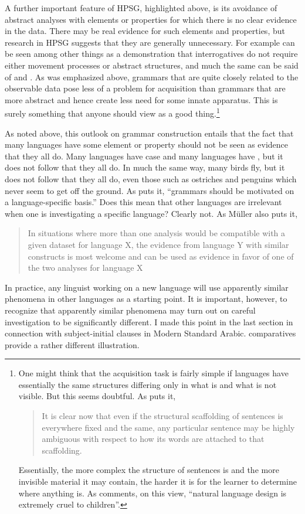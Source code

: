 \documentclass[output=paper]{langsci/langscibook}
\begin{document}
A further important feature of \gls{HPSG}, highlighted above, is its avoidance
of abstract analyses with elements or properties for which there is no clear
evidence in the data. There may be real evidence for such elements and
properties, but research in \gls{HPSG} suggests that they are generally
unnecessary.  For example \citet{GinSag2000} can be seen among other things as
a demonstration that  interrogatives do not require either
movement processes or abstract structures, and much the same can be said of
\citet{Sag1997} and  . As was emphasized above,
grammars that are quite closely related to the observable data pose less
of a problem for acquisition than grammars that are more abstract and hence
create less need for some innate apparatus. This is surely something that
anyone should view as a good thing.\footnote{One might think that the acquisition
    task is fairly simple if languages have essentially the same structures
    differing only in what is and what is not visible. But this seems doubtful.
    As \citet[765]{Fodor2001} puts it, \blockquote{It is clear now that even if
        the structural scaffolding of sentences is everywhere fixed and the
        same, any particular sentence may be highly ambiguous with respect to
        how its words are attached to that scaffolding.} Essentially, the more
        complex the structure of sentences is and the more invisible material
    it may contain, the harder it is for the learner to determine where
anything is. As \citet[763]{Fodor2001} comments, on this view, \enquote{natural
language design is extremely cruel to children}.}

As noted above, this outlook on grammar construction entails that the fact that
many languages have some element or property should not be seen as evidence
that they all do. Many languages have case and many languages have
, but it does not follow that they all do. In much the same way,
many birds fly, but it does not follow that they all do, even those such as
ostriches and penguins which never seem to get off the ground. As
\citet[25]{Muller2015} puts it, \enquote{grammars should be motivated on a
    language-specific basis.} Does this mean that other languages are
    irrelevant when one is investigating a specific language?  Clearly not. As
    Müller also puts it, \blockquote[{\citealt[43]{Muller2015}}][.]{In
        situations where more than one analysis would be compatible with a
    given dataset for language X, the evidence from language Y with similar
constructs is most welcome and can be used as evidence in favor of one of the
two analyses for language X} In practice, any linguist working on a new
language will use apparently similar phenomena in other languages as a starting
point. It is important, however, to recognize that apparently similar phenomena
may turn out on careful investigation to be significantly different. I made
this point in the last section in connection with subject-initial clauses in
Modern Standard Arabic.   comparatives provide a rather different
illustration.
\end{document}

